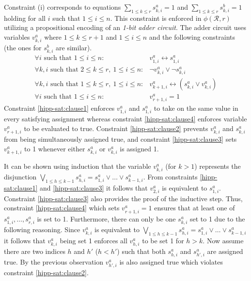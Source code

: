\documentclass[12pt,a4paper]{article}
\begin{document}
Constraint (i) corresponds to equations $\sum_{1\leq k\leq r} s^a_{k,i} = 1$ and $\sum_{1\leq k\leq r} s^b_{k,i} = 1$ holding for all $i$ such that $1\leq i \leq n$.
This constraint is enforced in $\phi (\mathcal{R}, r)$ utilizing a propositional encoding of an \emph{1-bit adder circuit}.
The adder circuit uses variables $v^a_{k,i}$ where $1\leq k \leq r+1$ and $1\leq i\leq n$ and the following constraints (the ones for $s^b_{k,i}$ are similar).
\begin{eqnarray}
\forall i\text{ such that } 1\leq i\leq n: & v^a_{1,i} \leftrightarrow s^a_{1,i}\label{hipp-sat:clause1}\\
\forall k, i\text{ such that } 2\leq k \leq r,\ 1\leq i\leq n: & \neg v^a_{k,i} \vee \neg s^a_{k,i}\label{hipp-sat:clause2}\\
\forall k, i\text{ such that } 1\leq k \leq r,\ 1\leq i\leq n: & v^a_{k+1,i} \leftrightarrow (s^a_{k,i}\vee v^a_{k,i} )\label{hipp-sat:clause3}\\
\forall i\text{ such that } 1\leq i\leq n: & v^a_{r+1,i}=1\label{hipp-sat:clause4}
\end{eqnarray}
Constraint \eqref{hipp-sat:clause1} enforces $v^a_{1,i}$ and $s^a_{1,i}$ to take on the same value in every satisfying assignment whereas constraint \eqref{hipp-sat:clause4} enforces variable $v^a_{r+1,i}$ to be evaluated to true.
Constraint \eqref{hipp-sat:clause2} prevents $v^a_{k,i}$ and $s^a_{k,i}$ from being simultaneously assigned true, 
and constraint \eqref{hipp-sat:clause3} sets $v^a_{k+1,i}$ to 1 whenever either $s^a_{k,i}$ or $v^a_{k,i}$ is assigned 1.

It can be shown using induction that the variable $v^a_{k,i}$ (for $k>1$) represents the disjunction $\bigvee_{1\leq h\leq k-1}s^a_{h,i} = s^a_{1,i}\vee\dots \vee s^a_{k-1,i}$.
From constraints \eqref{hipp-sat:clause1} and \eqref{hipp-sat:clause3} it follows that $v^a_{2,i}$ is equivalent to $s^a_{1,i}$.
Constraint \eqref{hipp-sat:clause3} also provides the proof of the inductive step.
Thus, constraint \eqref{hipp-sat:clause4} which sets $v^a_{r+1,i}=1$ ensures that at least one of $s^a_{1,i},\dots , s^a_{r,i}$ is set to 1.
Furthermore, there can only be one $s^a_{k,i}$ set to 1 due to the following reasoning.
Since $v^a_{k,i}$ is equivalent to $\bigvee_{1\leq h\leq k-1}s^a_{h,i} = s^a_{1,i}\vee\dots \vee s^a_{k-1,i}$ it follows that $v^a_{k,i}$ being set 1 enforces all $v^a_{h,i}$ to be set 1 for $h>k$.
Now assume there are two indices $h$ and $h'$ ($h<h'$) such that both $s^a_{h,i}$ and $s^a_{h',i}$ are assigned true.
By the previous observation $v^a_{h',i}$ is also assigned true which violates constraint \eqref{hipp-sat:clause2}.
\end{document}
